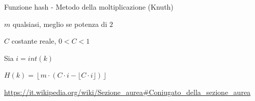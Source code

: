 \begin{frame}{Funzione hash - Metodo della moltiplicazione (Knuth)}

\vspace{-9pt}
\begin{myboxtitle}
\BI
\item $m$ qualsiasi, meglio se potenza di $2$
\item $C$ costante reale, $0 < C < 1$
\item Sia $i = \mathit{int}(k)$
\item $H(k) = \left\lfloor m \cdot (C \cdot i - \lfloor C\cdot i \rfloor) \right\rfloor$
\EI
\end{myboxtitle}

\begin{myboxtitle}[Esempio]
\end{myboxtitle}
\tiny \url{https://it.wikipedia.org/wiki/Sezione_aurea\#Coniugato_della_sezione_aurea}
   
\end{frame}

